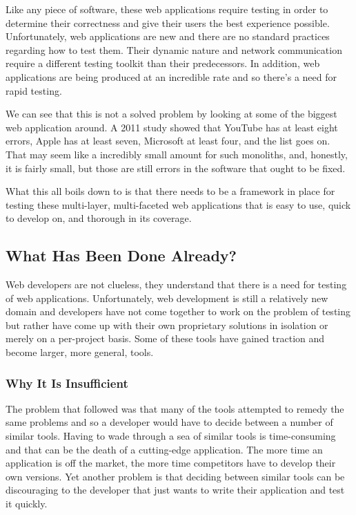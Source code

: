 \documentclass[11pt]{article}
\begin{document}
Like any piece of software, these web applications require testing in order to determine their correctness and give their users the best experience possible. Unfortunately, web applications are new and there are no standard practices regarding how to test them. Their dynamic nature and network communication require a different testing toolkit than their predecessors. In addition, web applications are being produced at an incredible rate and so there's a need for rapid testing.

We can see that this is not a solved problem by looking at some of the biggest web application around. A 2011 study showed that YouTube has at least eight errors, Apple has at least seven, Microsoft at least four, and the list goes on. \cite{ErrorsInTheWild} That may seem like a incredibly small amount for such monoliths, and, honestly, it is fairly small, but those are still errors in the software that ought to be fixed.

What this all boils down to is that there needs to be a framework in place for testing these multi-layer, multi-faceted web applications that is easy to use, quick to develop on, and thorough in its coverage.

\subsection{What Has Been Done Already?}
Web developers are not clueless, they understand that there is a need for testing of web applications. Unfortunately, web development is still a relatively new domain and developers have not come together to work on the problem of testing but rather have come up with their own proprietary solutions in isolation or merely on a per-project basis. Some of these tools have gained traction and become larger, more general, tools.


\subsubsection{Why It Is Insufficient}
The problem that followed was that many of the tools attempted to remedy the same problems and so a developer would have to decide between a number of similar tools. Having to wade through a sea of similar tools is time-consuming and that can be the death of a cutting-edge application. The more time an application is off the market, the more time competitors have to develop their own versions. Yet another problem is that deciding between similar tools can be discouraging to the developer that just wants to write their application and test it quickly.
\end{document}
